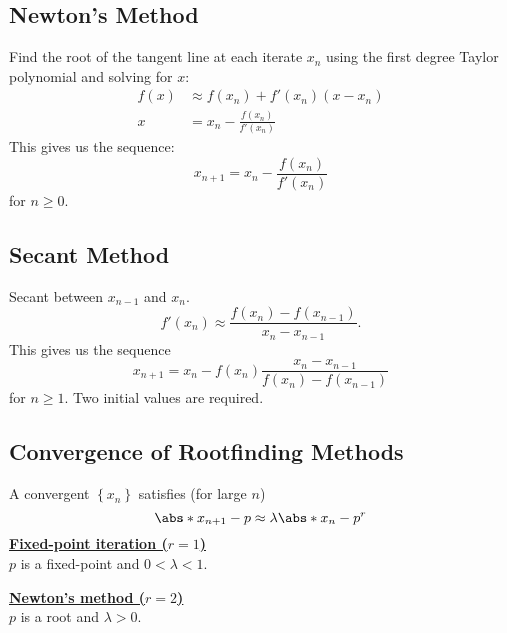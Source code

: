 \documentclass{article}
\begin{document}
\begin{minipage}[t]{62.39259259mm}
    \subsection{Newton's Method}
    Find the root of the tangent line at each iterate \(x_n\) using the first degree Taylor polynomial
    and solving for \(x\):
    \begin{align*}
        f\left( x \right) & \approx f\left( x_n \right) + f'\left( x_n \right) \left( x - x_n \right) \\
        x                 & = x_n - \frac{f\left( x_n \right)}{f'\left( x_n \right)}
    \end{align*}
    This gives us the sequence:
    \begin{equation*}
        x_{n + 1} = x_n - \frac{f\left( x_n \right)}{f'\left( x_n \right)}
    \end{equation*}
    for \(n \geq 0\).
    \subsection{Secant Method}
    Secant between \(x_{n - 1}\) and \(x_n\).
    \begin{equation*}
        f'\left( x_n \right) \approx \frac{f\left( x_n \right) - f\left( x_{n - 1} \right)}{x_n - x_{n - 1}}.
    \end{equation*}
    This gives us the sequence
    \begin{equation*}
        x_{n + 1} = x_n - f\left( x_n \right) \frac{x_n - x_{n - 1}}{f\left( x_n \right) - f\left( x_{n - 1} \right)}
    \end{equation*}
    for \(n \geq 1\). Two initial values are required.
    \subsection{Convergence of Rootfinding Methods}
    A convergent \(\left\{ x_n \right\}\) satisfies (for large \(n\))
    \begin{equation*}
        \abs*{x_{n + 1} - p} \approx \lambda \abs*{x_n - p}^r
    \end{equation*}
    \underline{\textbf{Fixed-point iteration (\(r = 1\))}} \\
    \(p\) is a fixed-point and \(0 < \lambda < 1\).

    \underline{\textbf{Newton's method (\(r = 2\))}} \\
    \(p\) is a root and \(\lambda > 0\).


\end{minipage}
\end{document}
